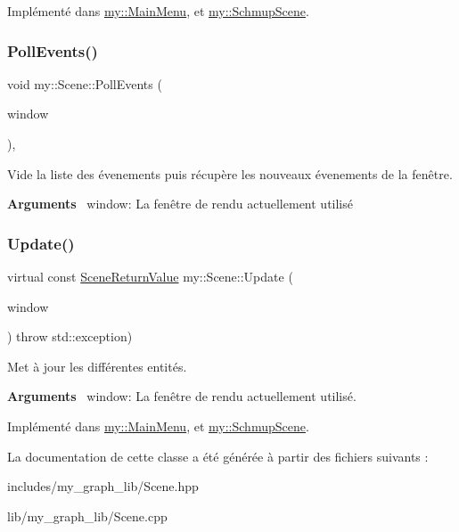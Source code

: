 Implémenté dans \hyperlink{classmy_1_1MainMenu_a56e81061a8d8d9a0da77267bd38ec058}{my\+::\+Main\+Menu}, et \hyperlink{classmy_1_1SchmupScene_ad1febbc7aaf1fc8b2eb4d02cdbf3f57a}{my\+::\+Schmup\+Scene}.

\mbox{\label{classmy_1_1Scene_a8e291c764cc4ca5c86c7ff803a7c40c8}} 
\subsubsection{\texorpdfstring{Poll\+Events()}{PollEvents()}}
{\footnotesize\ttfamily void my\+::\+Scene\+::\+Poll\+Events (\begin{DoxyParamCaption}\item[{sf\+::\+Render\+Window \&}]{window }\end{DoxyParamCaption})\hspace{0.3cm}{\ttfamily [protected]}, {\ttfamily [noexcept]}}



Vide la liste des évenements puis récupère les nouveaux évenements de la fenêtre. 

{\bfseries Arguments}~\newline
 window\+: La fenêtre de rendu actuellement utilisé \mbox{\label{classmy_1_1Scene_ae9799de62a6daa9650e040f9f17c78df}} 
\subsubsection{\texorpdfstring{Update()}{Update()}}
{\footnotesize\ttfamily virtual const \hyperlink{structmy_1_1SceneReturnValue}{Scene\+Return\+Value} my\+::\+Scene\+::\+Update (\begin{DoxyParamCaption}\item[{sf\+::\+Render\+Window \&}]{window }\end{DoxyParamCaption}) throw  std\+::exception) \hspace{0.3cm}{\ttfamily [pure virtual]}}



Met à jour les différentes entités. 

{\bfseries Arguments}~\newline
 window\+: La fenêtre de rendu actuellement utilisé. 

Implémenté dans \hyperlink{classmy_1_1MainMenu_ada39ad2f51014f08e4526056967daf47}{my\+::\+Main\+Menu}, et \hyperlink{classmy_1_1SchmupScene_ad07d5b2302f0a4250150d51fdcfa1c0b}{my\+::\+Schmup\+Scene}.



La documentation de cette classe a été générée à partir des fichiers suivants \+:\begin{DoxyCompactItemize}
\item 
includes/my\+\_\+graph\+\_\+lib/Scene.\+hpp\item 
lib/my\+\_\+graph\+\_\+lib/Scene.\+cpp\end{DoxyCompactItemize}
